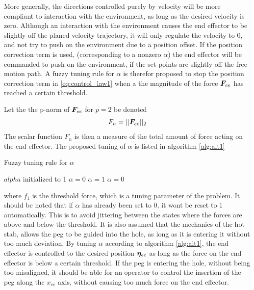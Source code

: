 More generally, the directions controlled purely by velocity will be more compliant to interaction with the environment, as long as the desired velocity is zero. Although an interaction with the environment causes the end effector to be slightly off the planed velocity trajectory, it will only regulate the velocity to 0, and not try to push on the environment due to a position offset. If the position correction term is used, (corresponding to a nonzero $\alpha$)
the end effector will be commanded to push on the environment, if the set-points are slightly off the free motion path. A fuzzy tuning rule for $\alpha$ is therefor proposed to stop the position correction term in \eqref{eq:control_law1} when a the magnitude of the force $\boldsymbol F_{ee}$ has reached a certain threshold. 



Let the the p-norm of $\boldsymbol F_{ee}$ for $p=2$ be denoted $$F_n=||\boldsymbol F_{ee}||_{2}$$ The scalar function $F_{n}$ is then a measure of the total amount of force acting on the end effector. The proposed tuning of $\alpha$ is listed in algorithm \ref{alg:alt1} 
	\begin{Algorithm}{12cm}
	\caption{Fuzzy tuning rule for $\alpha$ \label{alg:alt1}}
\begin{algorithmic}
	\REQUIRE $alpha$ initialized to 1
    \STATE    $\alpha=0$
        \STATE $\alpha=1$
    \ELSE
        \STATE $\alpha = 0$
    \ENDIF
\end{algorithmic}
\end{Algorithm}

where $f_{1}$ is the threshold force, which is a tuning parameter of the problem. It should be noted that if $\alpha$ has already been set to 0, it wont be reset to 1 automatically. This is to avoid jittering between the states where the forces are above and below the threshold. It is also assumed that the mechanics of the hot stab, allows the peg to be guided into the hole, as long as it is entering it without too much deviation.  By tuning $\alpha$ according to algorithm \ref{alg:alt1}, the end effector is controlled to the desired position $\boldsymbol \eta_{ee}$ as long as the force on the end effector is below a certain threshold. If the peg is entering the hole, without being too misaligned, it should be able for an operator to control the insertion of the peg along the $x_{ee}$ axis, without causing too much force on the end effector. 























